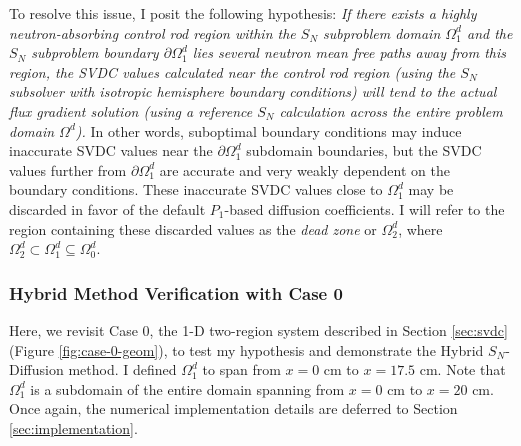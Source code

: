 To resolve this issue, I posit the following hypothesis: \textit{If there exists a highly
neutron-absorbing control rod region within the $S_N$ subproblem domain $\Omega^d_1$ and the $S_N$
subproblem boundary $\partial\Omega^d_1$ lies several neutron mean free paths away from this
region, the \gls{SVDC} values calculated near the control rod region (using the $S_N$ subsolver
with isotropic hemisphere boundary conditions) will tend to the actual flux gradient solution
(using a reference $S_N$ calculation across the entire problem domain $\Omega^d$).} In other words,
suboptimal boundary conditions may induce inaccurate \gls{SVDC} values near the $\partial
\Omega^d_1$ subdomain boundaries, but the \gls{SVDC} values further from $\partial\Omega^d_1$ are
accurate and very weakly dependent on the boundary conditions. These inaccurate \gls{SVDC} values
close to $\Omega^d_1$ may be discarded in favor of the default $P_1$-based diffusion coefficients.
I will refer to the region containing these discarded values as the \textit{dead zone} or
$\Omega^d_2$, where $\Omega^d_2 \subset \Omega^d_1 \subseteq \Omega^d_0$.

\subsubsection{Hybrid Method Verification with Case 0}

Here, we revisit Case 0, the 1-D two-region system described in Section \ref{sec:svdc} (Figure
\ref{fig:case-0-geom}), to test my hypothesis and demonstrate the Hybrid $S_N$-Diffusion method.
I defined $\Omega^d_1$ to span from $x=0$ cm to $x=17.5$ cm. Note that $\Omega^d_1$
is a subdomain of the entire domain spanning from $x=0$ cm to $x=20$ cm.
Once again, the numerical implementation details are deferred to Section \ref{sec:implementation}.

